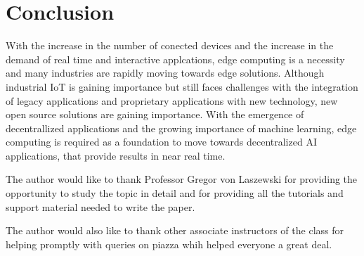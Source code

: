 \documentclass[sigconf]{acmart}
\begin{document}
\section{Conclusion}
With the increase in the number of conected devices and the increase in the demand of real time and interactive applcations, edge computing is a necessity and many industries are rapidly moving towards edge solutions. Although industrial IoT is gaining importance but still faces challenges with the integration of legacy applications and proprietary applications with new technology, new open source solutions are gaining importance. With the emergence of decentrallized applications and the growing importance of machine learning, edge computing is required as a foundation to move towards decentralized AI applications, that provide results in near real time.  

\begin{acks}
The author would like to thank Professor Gregor von Laszewski for providing the opportunity to study the topic in detail and for providing all the tutorials and support material needed to write the paper.

The author would also like to thank other associate instructors of the class for helping promptly with queries on piazza whih helped everyone a great deal.
\end{acks}


 
\end{document}
